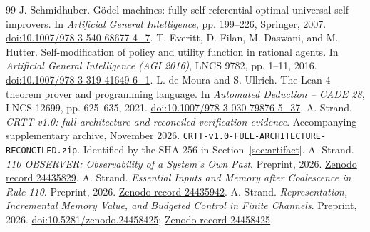 \begin{thebibliography}{99}
 J. Schmidhuber. G\"odel machines: fully self-referential optimal universal self-improvers. In \emph{Artificial General Intelligence}, pp. 199--226, Springer, 2007. \href{https://doi.org/10.1007/978-3-540-68677-4_7}{doi:10.1007/978-3-540-68677-4\_7}.
 T. Everitt, D. Filan, M. Daswani, and M. Hutter. Self-modification of policy and utility function in rational agents. In \emph{Artificial General Intelligence (AGI 2016)}, LNCS 9782, pp. 1--11, 2016. \href{https://doi.org/10.1007/978-3-319-41649-6_1}{doi:10.1007/978-3-319-41649-6\_1}.
 L. de Moura and S. Ullrich. The Lean 4 theorem prover and programming language. In \emph{Automated Deduction -- CADE 28}, LNCS 12699, pp. 625--635, 2021. \href{https://doi.org/10.1007/978-3-030-79876-5_37}{doi:10.1007/978-3-030-79876-5\_37}.
 A. Strand. \emph{CRTT v1.0: full architecture and reconciled verification evidence}. Accompanying supplementary archive, November 2026. \texttt{CRTT-v1.0-FULL-ARCHITECTURE-RECONCILED.zip}. Identified by the SHA-256 in Section~\ref{sec:artifact}.
 A. Strand. \emph{110 OBSERVER: Observability of a System's Own Past}. Preprint, 2026. \href{https://zenodo.org/records/24435829}{Zenodo record 24435829}.
 A. Strand. \emph{Essential Inputs and Memory after Coalescence in Rule 110}. Preprint, 2026. \href{https://zenodo.org/records/24435942}{Zenodo record 24435942}.
 A. Strand. \emph{Representation, Incremental Memory Value, and Budgeted Control in Finite Channels}. Preprint, 2026. \href{https://doi.org/10.5281/zenodo.24458425}{doi:10.5281/zenodo.24458425}; \href{https://zenodo.org/records/24458425}{Zenodo record 24458425}.
\end{thebibliography}
